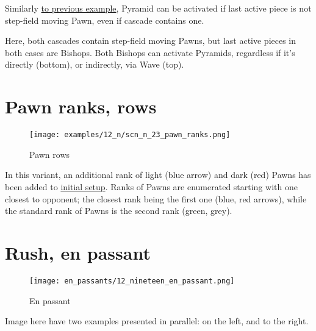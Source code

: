 Similarly
\hyperref[fig:scn_mv_39_activating_pyramid_cascade_pawn]{to previous example},
Pyramid can be activated if last active piece is not step-field moving Pawn, even
if cascade contains one.

Here, both cascades contain step-field moving Pawns, but last active pieces in both
cases are Bishops. Both Bishops can activate Pyramids, regardless if it's directly
(bottom), or indirectly, via Wave (top).

\clearpage %

\section*{Pawn ranks, rows}
\label{sec:Nineteen/Pawn ranks, rows}

\vspace*{-1.1\baselineskip}
\noindent
\begin{figure}[!h]
\texttt{[image: examples/12\_n/scn\_n\_23\_pawn\_ranks.png]}
\caption{Pawn rows}
\label{fig:scn_n_23_pawn_ranks}
\end{figure}

In this variant, an additional rank of light (blue arrow) and dark (red) Pawns has
been added to \hyperref[fig:12_nineteen]{initial setup}. Ranks of Pawns are enumerated
starting with one closest to opponent; the closest rank being the first one (blue,
red arrows), while the standard rank of Pawns is the second rank (green, grey).

\clearpage %

\section*{Rush, en passant}
\label{sec:Nineteen/Rush, en passant}

\vspace*{-0.3\baselineskip}
\noindent
\begin{wrapfigure}[14]{l}{0.4\textwidth}
\centering
\texttt{[image: en\_passants/12\_nineteen\_en\_passant.png]}
\caption{En passant}
\label{fig:12_nineteen_en_passant}
\end{wrapfigure}
Image here have two examples presented in parallel: on the left, and to the right.

